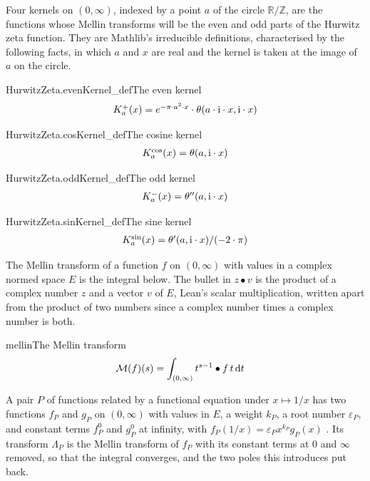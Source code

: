 \documentclass{article}
\begin{document}
Four kernels on $(0, \infty)$, indexed by a point $a$ of the circle
$\mathbb{R}/\mathbb{Z}$, are the functions whose Mellin transforms will be
the even and odd parts of the Hurwitz zeta function. They are Mathlib's
irreducible definitions, characterised by the following facts, in which $a$
and $x$ are real and the kernel is taken at the image of $a$ on the circle.

\begin{leanfact}[sum=tz_iWgXl2U]{HurwitzZeta.evenKernel_def}{The even kernel}
\label{fact:HurwitzZeta.evenKernel_def}
\[\LeanMath{K^{+}_{a}(x) = e^{-\pi \cdot a^{2} \cdot x} \cdot \theta(a \cdot \mathrm{i} \cdot x, \mathrm{i} \cdot x)}\]
\end{leanfact}

\begin{leanfact}[sum=L4av1Tyug5]{HurwitzZeta.cosKernel_def}{The cosine kernel}
\label{fact:HurwitzZeta.cosKernel_def}
\[\LeanMath{K^{\cos}_{a}(x) = \theta(a, \mathrm{i} \cdot x)}\]
\end{leanfact}

\begin{leanfact}[sum=x7s81Wc33D]{HurwitzZeta.oddKernel_def}{The odd kernel}
\label{fact:HurwitzZeta.oddKernel_def}
\[\LeanMath{K^{-}_{a}(x) = \theta''(a, \mathrm{i} \cdot x)}\]
\end{leanfact}

\begin{leanfact}[sum=eWui0GdHSf]{HurwitzZeta.sinKernel_def}{The sine kernel}
\label{fact:HurwitzZeta.sinKernel_def}
\[\LeanMath{K^{\sin}_{a}(x) = \theta'(a, \mathrm{i} \cdot x) / (-2 \cdot \pi)}\]
\end{leanfact}

The Mellin transform of a function $f$ on $(0, \infty)$ with values in a
complex normed space $E$ is the integral below. The bullet in $z \bullet v$
is the product of a complex number $z$ and a vector $v$ of $E$, Lean's
scalar multiplication, written apart from the product of two numbers since
a complex number times a complex number is both.

\begin{leandefinition}[def, sum=botFrI29QE]{mellin}{The Mellin transform}
\label{def:mellin}
\[\LeanMath{\begin{aligned}\mathcal{M}(f)(s) &= \int_{(0, \infty)} t^{s - 1} \bullet f\,t \,\mathrm{d}t\end{aligned}}\]
\end{leandefinition}

A pair $P$ of functions related by a functional equation under
$x \mapsto 1/x$ has two functions $f_P$ and $g_P$ on $(0, \infty)$ with
values in $E$, a weight $k_P$, a root number $\varepsilon_P$, and constant
terms $f^{0}_P$ and $g^{0}_P$ at infinity, with
$f_P(1/x) = \varepsilon_P x^{k_P} g_P(x)$ . Its
transform $\Lambda_P$ is the Mellin transform of $f_P$ with its constant
terms at $0$ and $\infty$ removed, so that the integral converges, and the
two poles this introduces put back.
\end{document}
